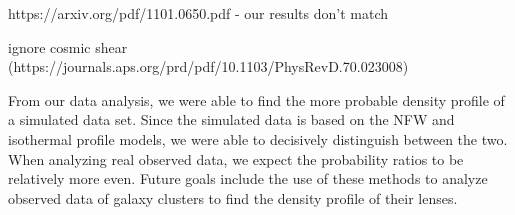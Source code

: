 \documentclass[10pt]{article}
\begin{document}
https://arxiv.org/pdf/1101.0650.pdf - our results don't match

ignore cosmic shear (https://journals.aps.org/prd/pdf/10.1103/PhysRevD.70.023008)

From our data analysis, we were able to find the more probable density profile of a simulated data set.
Since the simulated data is based on the NFW and isothermal profile models, we were able to decisively distinguish between the two.
When analyzing real observed data, we expect the probability ratios to be relatively more even.
Future goals include the use of these methods to analyze observed data of galaxy clusters to find the density profile of their lenses.





\end{document}
